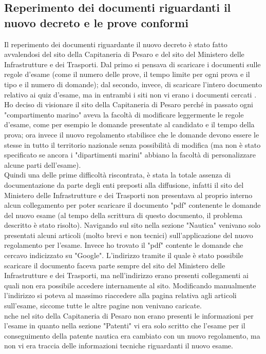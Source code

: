 \subsection{Reperimento dei documenti riguardanti il nuovo decreto e le prove conformi}
Il reperimento dei documenti riguardante il nuovo decreto è stato fatto avvalendosi del sito della Capitaneria di Pesaro e del sito del Ministero delle Infrastrutture e dei Trasporti. Dal primo si pensava di scaricare i documenti sulle regole d'esame (come il numero delle prove, il tempo limite per ogni prova e il tipo e il numero di domande); dal secondo, invece,  di scaricare l'intero documento relativo ai quiz d'esame, ma in entrambi i siti non vi erano i documenti cercati . Ho deciso di visionare il sito della Capitaneria di Pesaro perché in passato ogni "compartimento marino" aveva la facoltà di modificare leggermente le regole d'esame, come per esempio le domande presentate al candidato e il tempo della prova; ora invece  il nuovo regolamento stabilisce che le domande devono essere le stesse in tutto il territorio nazionale senza possibilità di modifica (ma non è stato specificato se ancora i "dipartimenti marini" abbiano la facoltà di personalizzare alcune parti dell'esame).\\
Quindi una delle prime difficoltà riscontrata, è stata la totale assenza di documentazione da parte degli enti preposti alla diffusione, infatti  il sito del Ministero delle Infrastrutture e dei Trasporti non presentava al proprio interno alcun collegamento per poter scaricare il documento "pdf" contenente le domande del nuovo esame (al tempo della scrittura di questo documento, il problema descritto è stato risolto). Navigando sul sito nella sezione "Nautica" venivano solo presentati alcuni articoli (molto brevi e non tecnici)  sull'applicazione del nuovo regolamento per l'esame. Invece ho trovato il "pdf" contente le domande che cercavo indicizzato su "Google". L'indirizzo  tramite il quale è stato possibile scaricare il documento faceva parte sempre del sito del Ministero delle Infrastrutture e dei Trasporti, ma nell'indirizzo erano presenti collegamenti ai quali non era possibile accedere internamente al sito. Modificando manualmente l'indirizzo  si poteva al massimo riaccedere alla pagina relativa agli articoli sull'esame, siccome tutte le altre pagine non venivano caricate.\\
nche nel sito della Capitaneria di Pesaro non erano presenti le informazioni per l'esame in quanto nella sezione "Patenti" vi era solo scritto che l'esame per il conseguimento della patente nautica era cambiato con un nuovo regolamento, ma non vi era traccia delle informazioni tecniche riguardanti il nuovo esame.\\
